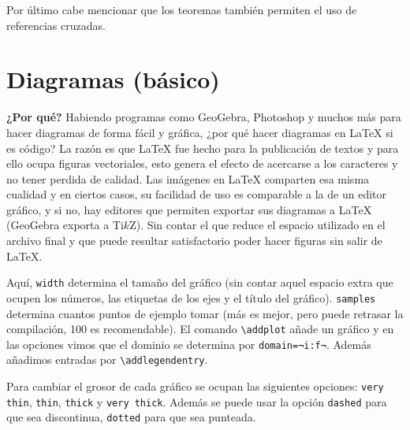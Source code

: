Por último cabe mencionar que los teoremas también permiten el uso de referencias cruzadas.

\section{Diagramas (básico)}
\textbf{¿Por qué?} Habiendo programas como GeoGebra, Photoshop y muchos más para hacer diagramas de forma fácil y gráfica, ¿por qué hacer diagramas en \LaTeX{} si es código? La razón es que \LaTeX{} fue hecho para la publicación de textos y para ello ocupa figuras vectoriales, esto genera el efecto de acercarse a los caracteres y no tener perdida de calidad.
Las imágenes en \LaTeX{} comparten esa misma cualidad y en ciertos casos, su facilidad de uso es comparable a la de un editor gráfico, y si no, hay editores que permiten exportar sus diagramas a \LaTeX{} (GeoGebra exporta a Ti$k$Z). Sin contar el que reduce el espacio utilizado en el archivo final y que puede resultar satisfactorio poder hacer figuras sin salir de \LaTeX{}.

Aquí, \texttt{width} determina el tamaño del gráfico (sin contar aquel espacio extra que ocupen los números, las etiquetas de los ejes y el título del gráfico). \texttt{samples} determina cuantos puntos de ejemplo tomar (más es mejor, pero puede retrasar la compilación, 100 es recomendable). El comando \lstinline|\addplot| añade un gráfico y en las opciones vimos que el dominio se determina por \lstinline|domain=¬i:f¬|. Además añadimos entradas por \lstinline|\addlegendentry|.

Para cambiar el grosor de cada gráfico se ocupan las siguientes opciones: \texttt{very thin}, \texttt{thin}, \texttt{thick} y \texttt{very thick}. Además se puede usar la opción \texttt{dashed} para que sea discontinua, \texttt{dotted} para que sea punteada. 

